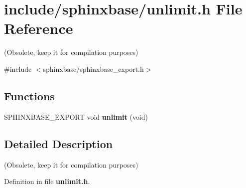 \section{include/sphinxbase/unlimit.h \-File \-Reference}
\label{unlimit_8h}


(\-Obsolete, keep it for compilation purposes)  


{\ttfamily \#include $<$sphinxbase/sphinxbase\-\_\-export.\-h$>$}\*
\subsection*{\-Functions}
\begin{DoxyCompactItemize}
\item 
\-S\-P\-H\-I\-N\-X\-B\-A\-S\-E\-\_\-\-E\-X\-P\-O\-R\-T void {\bfseries unlimit} (void)\label{unlimit_8h_a0b8bf51305f48eb78ff53ebb8ad27248}

\end{DoxyCompactItemize}


\subsection{\-Detailed \-Description}
(\-Obsolete, keep it for compilation purposes) 

\-Definition in file {\bf unlimit.\-h}.

